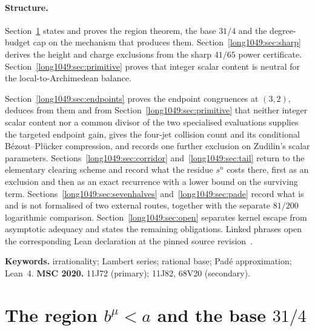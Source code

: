 \paragraph{Structure.}
Section~\ref{long1049:sec:region} states and proves the region theorem, the base $31/4$
and the degree-budget cap on the mechanism that produces them.
Section~\ref{long1049:sec:sharp} derives the height and charge exclusions from the sharp
$41/65$ power certificate.  Section~\ref{long1049:sec:primitive} proves that integer scalar content is neutral for the
local-to-Archimedean balance.

Section~\ref{long1049:sec:endpoints} proves the endpoint
congruences at $(3,2)$, deduces from them and from
Section~\ref{long1049:sec:primitive} that neither integer scalar content nor a common divisor
of the two specialised evaluations supplies the targeted endpoint gain, gives the
four-jet collision count and its conditional B\'ezout--Pl\"ucker compression, and records one further
exclusion on Zudilin's scalar parameters.
Sections~\ref{long1049:sec:corridor} and~\ref{long1049:sec:tail} return to the elementary
clearing scheme and record what the residue $s^{n}$ costs there, first as an
exclusion and then as an exact recurrence with a lower bound on the surviving
term.  Sections~\ref{long1049:sec:sevenhalves} and~\ref{long1049:sec:pade} record what is and is
not formalised of two external routes, together with the separate $81/200$
logarithmic comparison.  Section~\ref{long1049:sec:open} separates kernel escape from
asymptotic adequacy and states the remaining obligations.  Linked phrases open the corresponding Lean
declaration at the pinned source revision~\commitshort.

\medskip
\noindent\textbf{Keywords.} irrationality; Lambert series; rational base;
Pad\'e approximation; Lean~4.
\qquad
\textbf{MSC 2020.} 11J72 (primary); 11J82, 68V20 (secondary).

\section{The region \texorpdfstring{$b^{\mu}<a$}{b\textasciicircum mu < a} and the base \texorpdfstring{$31/4$}{31/4}}\label{long1049:sec:region}

